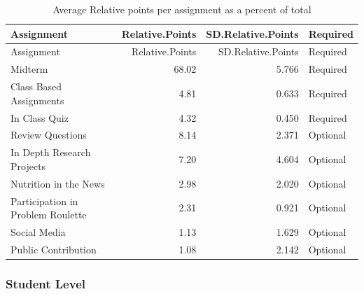 \documentclass[]{article}
\newenvironment{Shaded}{\begin{snugshade}}{\end{snugshade}}
\newcommand{\KeywordTok}[1]{\textcolor[rgb]{0.13,0.29,0.53}{\textbf{#1}}}
\newcommand{\DataTypeTok}[1]{\textcolor[rgb]{0.13,0.29,0.53}{#1}}
\newcommand{\DecValTok}[1]{\textcolor[rgb]{0.00,0.00,0.81}{#1}}
\newcommand{\FloatTok}[1]{\textcolor[rgb]{0.00,0.00,0.81}{#1}}
\newcommand{\StringTok}[1]{\textcolor[rgb]{0.31,0.60,0.02}{#1}}
\newcommand{\OperatorTok}[1]{\textcolor[rgb]{0.81,0.36,0.00}{\textbf{#1}}}
\newcommand{\NormalTok}[1]{#1}
\begin{document}
\begin{longtable}[]{@{}lrrl@{}}
\caption{Average Relative points per assignment as a percent of
total}\tabularnewline
\toprule
Assignment & Relative.Points & SD.Relative.Points &
Required\tabularnewline
\midrule
\endfirsthead
\toprule
Assignment & Relative.Points & SD.Relative.Points &
Required\tabularnewline
\midrule
\endhead
Midterm & 68.02 & 5.766 & Required\tabularnewline
Class Based Assignments & 4.81 & 0.633 & Required\tabularnewline
In Class Quiz & 4.32 & 0.450 & Required\tabularnewline
Review Questions & 8.14 & 2.371 & Optional\tabularnewline
In Depth Research Projects & 7.20 & 4.604 & Optional\tabularnewline
Nutrition in the News & 2.98 & 2.020 & Optional\tabularnewline
Participation in Problem Roulette & 2.31 & 0.921 &
Optional\tabularnewline
Social Media & 1.13 & 1.629 & Optional\tabularnewline
Public Contribution & 1.08 & 2.142 & Optional\tabularnewline
\bottomrule
\end{longtable}

\subsubsection{Student Level}\label{student-level}

\begin{Shaded}
\end{Shaded}
\end{document}
